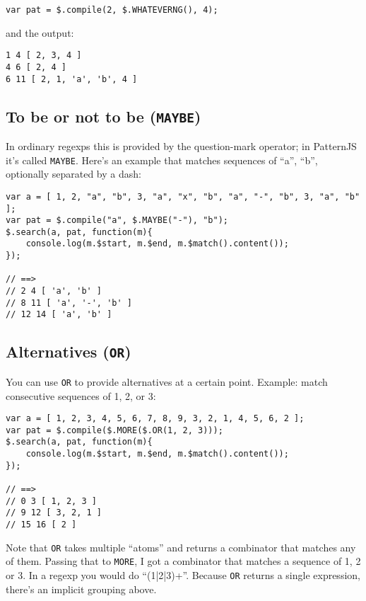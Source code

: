 \documentclass[a4paper,10pt]{article}
\begin{document}
\begin{verbatim}
var pat = $.compile(2, $.WHATEVERNG(), 4);
\end{verbatim}

and the output:


\begin{verbatim}
1 4 [ 2, 3, 4 ]
4 6 [ 2, 4 ]
6 11 [ 2, 1, 'a', 'b', 4 ]
\end{verbatim}
\subsection{To be or not to be (\texttt{MAYBE})}
\label{sec-2-4}


In ordinary regexps this is provided by the question-mark operator; in
PatternJS it's called \texttt{MAYBE}.  Here's an example that matches sequences of
“a”, “b”, optionally separated by a dash:


\begin{verbatim}
var a = [ 1, 2, "a", "b", 3, "a", "x", "b", "a", "-", "b", 3, "a", "b" ];
var pat = $.compile("a", $.MAYBE("-"), "b");
$.search(a, pat, function(m){
    console.log(m.$start, m.$end, m.$match().content());
});

// ==>
// 2 4 [ 'a', 'b' ]
// 8 11 [ 'a', '-', 'b' ]
// 12 14 [ 'a', 'b' ]
\end{verbatim}
\subsection{Alternatives (\texttt{OR})}
\label{sec-2-5}


You can use \texttt{OR} to provide alternatives at a certain point.  Example: match
consecutive sequences of 1, 2, or 3:


\begin{verbatim}
var a = [ 1, 2, 3, 4, 5, 6, 7, 8, 9, 3, 2, 1, 4, 5, 6, 2 ];
var pat = $.compile($.MORE($.OR(1, 2, 3)));
$.search(a, pat, function(m){
    console.log(m.$start, m.$end, m.$match().content());
});

// ==>
// 0 3 [ 1, 2, 3 ]
// 9 12 [ 3, 2, 1 ]
// 15 16 [ 2 ]
\end{verbatim}

Note that \texttt{OR} takes multiple “atoms” and returns a combinator that matches
any of them.  Passing that to \texttt{MORE}, I got a combinator that matches a
sequence of 1, 2 or 3.  In a regexp you would do “(1|2|3)+”.  Because \texttt{OR}
returns a single expression, there's an implicit grouping above.
\end{document}
